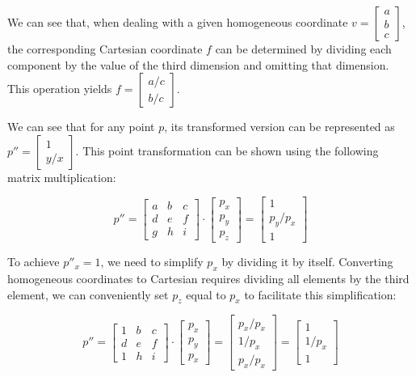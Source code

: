 \documentclass{article}
\begin{document}
We can see that, when dealing with a given homogeneous coordinate $v = \begin{bmatrix} a \\ b \\ c \end{bmatrix}$, the corresponding Cartesian coordinate $f$ can be determined by dividing each component by the value of the third dimension and omitting that dimension. This operation yields $f = \begin{bmatrix} a/c \\ b/c \end{bmatrix}$.

We can see that for any point $p$, its transformed version can be represented as $p'' = \begin{bmatrix} 1 \\ y/x \end{bmatrix}$. This point transformation can be shown using the following matrix multiplication:

\[
    p'' = \begin{bmatrix} a & b & c \\ d & e & f \\ g & h & i \end{bmatrix} \cdot \begin{bmatrix} p_x \\ p_y \\ p_z \end{bmatrix} = \begin{bmatrix} 1 \\ p_y/p_x \\ 1 \end{bmatrix}
\]

To achieve $p''_x = 1$, we need to simplify $p_x$ by dividing it by itself. Converting homogeneous coordinates to Cartesian requires dividing all elements by the third element, we can conveniently set $p_z$ equal to $p_x$ to facilitate this simplification:

\[
    p'' = \begin{bmatrix} 1 & b & c \\ d & e & f \\ 1 & h & i \end{bmatrix} \cdot \begin{bmatrix} p_x \\ p_y \\ p_x \end{bmatrix} = \begin{bmatrix} p_x/p_x \\ 1/p_x \\ p_x / p_x \end{bmatrix} = \begin{bmatrix} 1 \\ 1 / p_x \\ 1 \end{bmatrix}
\]
\end{document}
